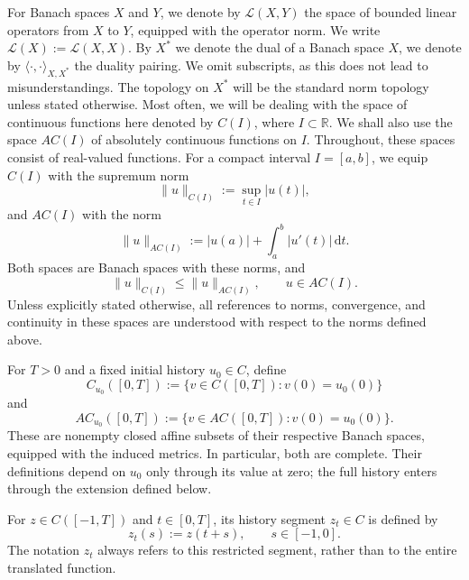 \documentclass[reqno]{amsart}
\theoremstyle{plain}
\numberwithin{equation}{section}
\numberwithin{definition}{section}
\newcommand\RR{\ensuremath{\mathbb{R}}}
\newcommand{\dd}{\ensuremath{\mathrm{d}}}
\begin{document}
For Banach spaces $X$ and $Y$, we denote by
$\mathcal L(X,Y)$ the space of bounded linear operators
from $X$ to $Y$, equipped with the operator norm.
We write $\mathcal L(X):=\mathcal L(X,X)$. 
By $X^*$ we denote the dual of a Banach space $X$, we denote by $\langle \cdot, \cdot \rangle_{X, X^*}$ the duality pairing. We omit subscripts, as this does not lead to misunderstandings. The topology on $X^*$ will be the standard norm topology unless stated otherwise. Most often, we will be dealing with the space of continuous functions here denoted by $C(I)$, where $I\subset \RR$. We shall also use the space $AC(I)$ of absolutely continuous
functions on $I$. Throughout, these spaces consist of
real-valued functions. For a compact interval $I=[a,b]$,
we equip $C(I)$ with the supremum norm
\begin{equation*}
    \|u\|_{C(I)}:=\sup_{t\in I}|u(t)|,
\end{equation*}
and $AC(I)$ with the norm
\begin{equation*}
    \|u\|_{AC(I)}
    :=
    |u(a)|+\int_a^b |u'(t)|\,\dd t.
\end{equation*}
Both spaces are Banach spaces with these norms, and
\begin{equation*}
    \|u\|_{C(I)}\leq\|u\|_{AC(I)},
    \qquad u\in AC(I).
\end{equation*}
Unless explicitly stated otherwise, all references to
norms, convergence, and continuity in these spaces
are understood with respect to the norms defined above.

For $T>0$ and a fixed initial history $u_0\in C$, define
\begin{equation*}
    C_{u_0}([0,T])
    :=
    \{v\in C([0,T]):v(0)=u_0(0)\}
\end{equation*}
and
\begin{equation*}
    AC_{u_0}([0,T])
    :=
    \{v\in AC([0,T]):v(0)=u_0(0)\}.
\end{equation*}
These are nonempty closed affine subsets of their
respective Banach spaces, equipped with the induced
metrics. In particular, both are complete.
Their definitions depend on $u_0$ only through
its value at zero; the full history enters through
the extension defined below.

\smallskip\par
For $z\in C([-1,T])$ and $t\in[0,T]$, its history
segment $z_t\in C$ is defined by
\begin{equation*}
    z_t(s):=z(t+s),
    \qquad s\in[-1,0].
\end{equation*}
The notation $z_t$ always refers to this restricted
segment, rather than to the entire translated function.
\end{document}
